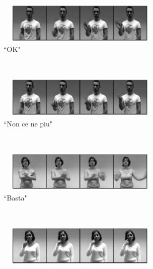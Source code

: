\begin{figure}[t]
        \centering
        \begin{subfigure}[c]{.5\textwidth}
        \centering
                \includegraphics[width=8cm,height=2cm, clip]{images/3dcnn_filters/original_images_gray_body_ok}
                \caption{``OK"}
        \end{subfigure}%
        \\
        \begin{subfigure}[c]{0.5\textwidth}
        \centering
                \includegraphics[width=8cm,height=2cm, clip]{images/3dcnn_filters/original_images_gray_body_ncnp}
                \caption{``Non ce ne piu"}
        \end{subfigure}
        \\
       \begin{subfigure}[c]{0.5\textwidth}
        \centering
                \includegraphics[width=8cm,height=2cm, clip]{images/3dcnn_filters/original_images_gray_body_basta}
                \caption{``Basta"}
        \end{subfigure}
       \\
       \begin{subfigure}[c]{0.5\textwidth}
        \centering
                \includegraphics[width=8cm,height=2cm, clip]{images/3dcnn_filters/original_images_gray_body_buonissimo}

\end{subfigure}
\end{figure}
